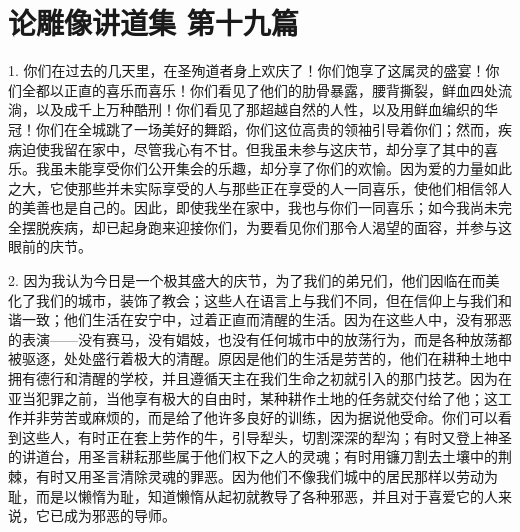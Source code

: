 

\section{论雕像讲道集 第十九篇}

\par

1. 你们在过去的几天里，在圣殉道者身上欢庆了！你们饱享了这属灵的盛宴！你们全都以正直的喜乐而喜乐！你们看见了他们的肋骨暴露，腰背撕裂，鲜血四处流淌，以及成千上万种酷刑！你们看见了那超越自然的人性，以及用鲜血编织的华冠！你们在全城跳了一场美好的舞蹈，你们这位高贵的领袖引导着你们；然而，疾病迫使我留在家中，尽管我心有不甘。但我虽未参与这庆节，却分享了其中的喜乐。我虽未能享受你们公开集会的乐趣，却分享了你们的欢愉。因为爱的力量如此之大，它使那些并未实际享受的人与那些正在享受的人一同喜乐，使他们相信邻人的美善也是自己的。因此，即使我坐在家中，我也与你们一同喜乐；如今我尚未完全摆脱疾病，却已起身跑来迎接你们，为要看见你们那令人渴望的面容，并参与这眼前的庆节。\par

2. 因为我认为今日是一个极其盛大的庆节，为了我们的弟兄们，他们因临在而美化了我们的城市，装饰了教会；这些人在语言上与我们不同，但在信仰上与我们和谐一致；他们生活在安宁中，过着正直而清醒的生活。因为在这些人中，没有邪恶的表演——没有赛马，没有娼妓，也没有任何城市中的放荡行为，而是各种放荡都被驱逐，处处盛行着极大的清醒。原因是他们的生活是劳苦的，他们在耕种土地中拥有德行和清醒的学校，并且遵循天主在我们生命之初就引入的那门技艺。因为在亚当犯罪之前，当他享有极大的自由时，某种耕作土地的任务就交付给了他；这工作并非劳苦或麻烦的，而是给了他许多良好的训练，因为据说他受命。你们可以看到这些人，有时正在套上劳作的牛，引导犁头，切割深深的犁沟；有时又登上神圣的讲道台，用圣言耕耘那些属于他们权下之人的灵魂；有时用镰刀割去土壤中的荆棘，有时又用圣言清除灵魂的罪恶。因为他们不像我们城中的居民那样以劳动为耻，而是以懒惰为耻，知道懒惰从起初就教导了各种邪恶，并且对于喜爱它的人来说，它已成为邪恶的导师。\par

